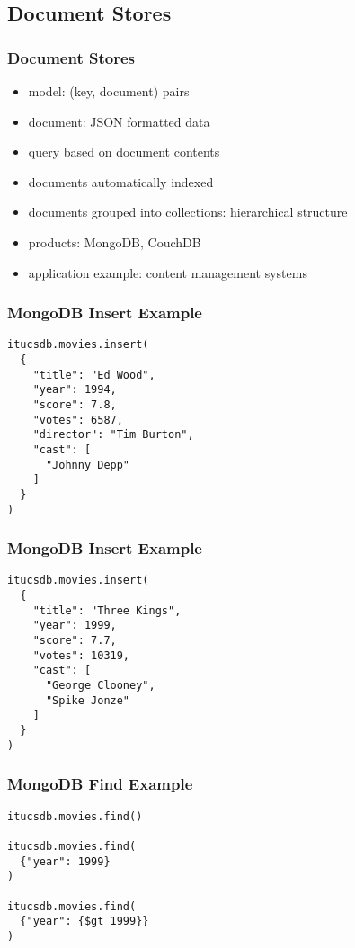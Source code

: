 \documentclass[dvipsnames]{beamer}
\theoremstyle{plain}
\begin{document}
\subsection{Document Stores}

\begin{frame}
  \frametitle{Document Stores}

  \begin{itemize}
    \item model: (key, document) pairs
    \item document: JSON formatted data

    \medskip
    \item query based on document contents
    \item documents automatically indexed
    \item documents grouped into collections: hierarchical structure

    \bigskip
    \item products: MongoDB, CouchDB
    \item application example: content management systems
  \end{itemize}
\end{frame}

\begin{frame}[fragile]
  \frametitle{MongoDB Insert Example}

  \begin{lstlisting}
itucsdb.movies.insert(
  {
    "title": "Ed Wood",
    "year": 1994,
    "score": 7.8,
    "votes": 6587,
    "director": "Tim Burton",
    "cast": [
      "Johnny Depp"
    ]
  }
)
  \end{lstlisting}
\end{frame}

\begin{frame}[fragile]
  \frametitle{MongoDB Insert Example}

  \begin{lstlisting}
itucsdb.movies.insert(
  {
    "title": "Three Kings",
    "year": 1999,
    "score": 7.7,
    "votes": 10319,
    "cast": [
      "George Clooney",
      "Spike Jonze"
    ]
  }
)
  \end{lstlisting}
\end{frame}

\begin{frame}[fragile]
  \frametitle{MongoDB Find Example}

  \begin{lstlisting}
itucsdb.movies.find()

itucsdb.movies.find(
  {"year": 1999}
)

itucsdb.movies.find(
  {"year": {$gt 1999}}
)
  \end{lstlisting}
\end{frame}
\end{document}
